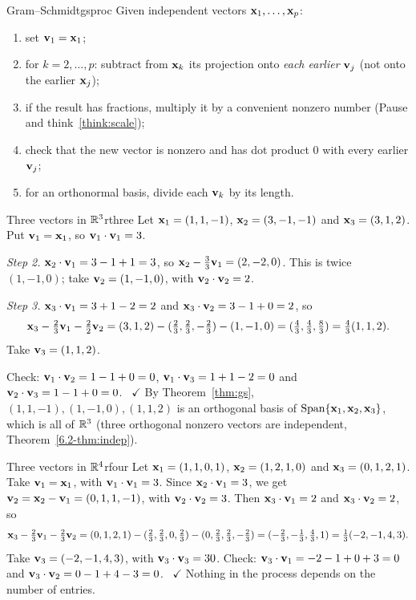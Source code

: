 \documentclass[11pt]{article}
\begin{document}
\begin{proc}{Gram--Schmidt}{gsproc}
Given independent vectors $\mathbf{x}_1,\dots,\mathbf{x}_p$:
\begin{enumerate}[nosep]
  \item set $\mathbf{v}_1=\mathbf{x}_1$;
  \item for $k=2,\dots,p$: subtract from $\mathbf{x}_k$ its projection onto \emph{each earlier} $\mathbf{v}_j$ (not onto the earlier $\mathbf{x}_j$);
  \item if the result has fractions, multiply it by a convenient nonzero number (Pause and think~\ref{think:scale});
  \item check that the new vector is nonzero and has dot product $0$ with every earlier $\mathbf{v}_j$;
  \item for an orthonormal basis, divide each $\mathbf{v}_k$ by its length.
\end{enumerate}
\end{proc}

\begin{exmp}{Three vectors in $\mathbb{R}^3$}{rthree}
Let $\mathbf{x}_1=(1,1,-1)$, $\mathbf{x}_2=(3,-1,-1)$ and $\mathbf{x}_3=(3,1,2)$. Put $\mathbf{v}_1=\mathbf{x}_1$, so $\mathbf{v}_1\cdot\mathbf{v}_1=3$.

\emph{Step 2.} $\mathbf{x}_2\cdot\mathbf{v}_1=3-1+1=3$, so $\mathbf{x}_2-\tfrac33\mathbf{v}_1=(2,-2,0)$. This is twice $(1,-1,0)$; take $\mathbf{v}_2=(1,-1,0)$, with $\mathbf{v}_2\cdot\mathbf{v}_2=2$.

\emph{Step 3.} $\mathbf{x}_3\cdot\mathbf{v}_1=3+1-2=2$ and $\mathbf{x}_3\cdot\mathbf{v}_2=3-1+0=2$, so
\[
\mathbf{x}_3-\tfrac23\mathbf{v}_1-\tfrac22\mathbf{v}_2=(3,1,2)-(\tfrac23,\tfrac23,-\tfrac23)-(1,-1,0)=(\tfrac43,\tfrac43,\tfrac83)=\tfrac43(1,1,2).
\]
Take $\mathbf{v}_3=(1,1,2)$.

Check: $\mathbf{v}_1\cdot\mathbf{v}_2=1-1+0=0$, $\mathbf{v}_1\cdot\mathbf{v}_3=1+1-2=0$ and $\mathbf{v}_2\cdot\mathbf{v}_3=1-1+0=0$. \ $\checkmark$ By Theorem~\ref{thm:gs}, $(1,1,-1),(1,-1,0),(1,1,2)$ is an orthogonal basis of $\operatorname{Span}\{\mathbf{x}_1,\mathbf{x}_2,\mathbf{x}_3\}$, which is all of $\mathbb{R}^3$ (three orthogonal nonzero vectors are independent, Theorem~\ref{6.2-thm:indep}).
\end{exmp}

\begin{exmp}{Three vectors in $\mathbb{R}^4$}{rfour}
Let $\mathbf{x}_1=(1,1,0,1)$, $\mathbf{x}_2=(1,2,1,0)$ and $\mathbf{x}_3=(0,1,2,1)$. Take $\mathbf{v}_1=\mathbf{x}_1$, with $\mathbf{v}_1\cdot\mathbf{v}_1=3$. Since $\mathbf{x}_2\cdot\mathbf{v}_1=3$, we get $\mathbf{v}_2=\mathbf{x}_2-\mathbf{v}_1=(0,1,1,-1)$, with $\mathbf{v}_2\cdot\mathbf{v}_2=3$. Then $\mathbf{x}_3\cdot\mathbf{v}_1=2$ and $\mathbf{x}_3\cdot\mathbf{v}_2=2$, so
\[
\mathbf{x}_3-\tfrac23\mathbf{v}_1-\tfrac23\mathbf{v}_2=(0,1,2,1)-(\tfrac23,\tfrac23,0,\tfrac23)-(0,\tfrac23,\tfrac23,-\tfrac23)=(-\tfrac23,-\tfrac13,\tfrac43,1)=\tfrac13(-2,-1,4,3).
\]
Take $\mathbf{v}_3=(-2,-1,4,3)$, with $\mathbf{v}_3\cdot\mathbf{v}_3=30$. Check: $\mathbf{v}_3\cdot\mathbf{v}_1=-2-1+0+3=0$ and $\mathbf{v}_3\cdot\mathbf{v}_2=0-1+4-3=0$. \ $\checkmark$ Nothing in the process depends on the number of entries.
\end{exmp}
\end{document}
